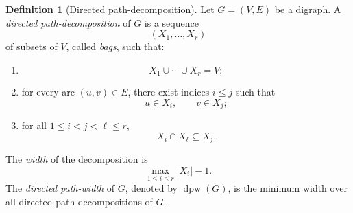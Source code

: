 \documentclass[10pt]{book}
\theoremstyle{definition}
\newtheorem{definition}[theorem]{Definition}
\begin{document}
\begin{definition}[Directed path-decomposition]
\cite{67,70}
Let \(G=(V,E)\) be a digraph.  
A \emph{directed path-decomposition} of \(G\) is a sequence
\[
(X_1,\dots,X_r)
\]
of subsets of \(V\), called \emph{bags}, such that:
\begin{enumerate}
    \item
    \[
    X_1\cup \cdots \cup X_r = V;
    \]
    \item for every arc \((u,v)\in E\), there exist indices \(i\leq j\) such that
    \[
    u\in X_i,\qquad v\in X_j;
    \]
    \item for all \(1\leq i<j<\ell\leq r\),
    \[
    X_i\cap X_\ell \subseteq X_j.
    \]
\end{enumerate}
The \emph{width} of the decomposition is
\[
\max_{1\leq i\leq r}|X_i|-1.
\]
The \emph{directed path-width} of \(G\), denoted by \(\operatorname{dpw}(G)\), is the minimum width over all directed path-decompositions of \(G\).
\end{definition}
\end{document}

